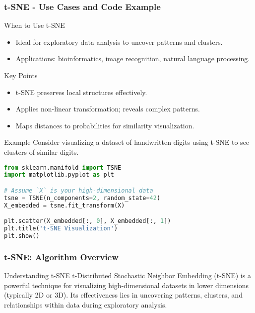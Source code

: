 \documentclass[aspectratio=169]{beamer}
\begin{document}
\begin{frame}[fragile]
    \frametitle{t-SNE - Use Cases and Code Example}
    \begin{block}{When to Use t-SNE}
        \begin{itemize}
            \item Ideal for exploratory data analysis to uncover patterns and clusters.
            \item Applications: bioinformatics, image recognition, natural language processing.
        \end{itemize}
    \end{block}

    \begin{block}{Key Points}
        \begin{itemize}
            \item t-SNE preserves local structures effectively.
            \item Applies non-linear transformation; reveals complex patterns.
            \item Maps distances to probabilities for similarity visualization.
        \end{itemize}
    \end{block}
    
    \begin{block}{Example}
        Consider visualizing a dataset of handwritten digits using t-SNE to see clusters of similar digits.
    \end{block}
    
    \begin{lstlisting}[language=Python]
from sklearn.manifold import TSNE
import matplotlib.pyplot as plt

# Assume `X` is your high-dimensional data
tsne = TSNE(n_components=2, random_state=42)
X_embedded = tsne.fit_transform(X)

plt.scatter(X_embedded[:, 0], X_embedded[:, 1])
plt.title('t-SNE Visualization')
plt.show()
    \end{lstlisting}
\end{frame}

\begin{frame}[fragile]
    \frametitle{t-SNE: Algorithm Overview}
    \begin{block}{Understanding t-SNE}
        t-Distributed Stochastic Neighbor Embedding (t-SNE) is a powerful technique for visualizing high-dimensional datasets in lower dimensions (typically 2D or 3D).
        Its effectiveness lies in uncovering patterns, clusters, and relationships within data during exploratory analysis.
    \end{block}
\end{frame}
\end{document}
